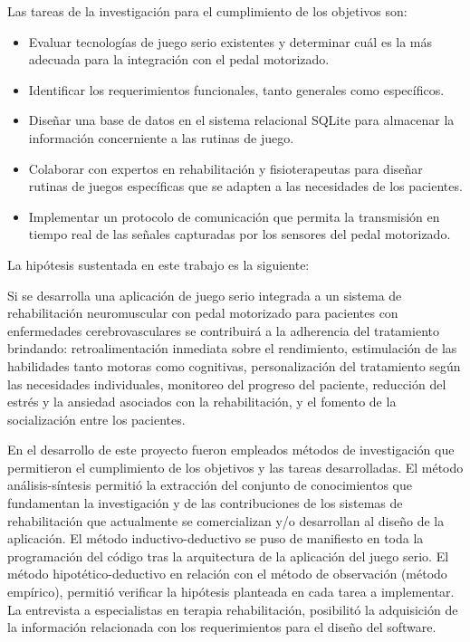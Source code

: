 \begin{introduction}
    Las tareas de la investigación para el cumplimiento de los objetivos son:
    \begin{itemize}
        \item Evaluar tecnologías de juego serio existentes y determinar cuál es la más adecuada para la integración con el pedal motorizado.
        \item Identificar los requerimientos funcionales, tanto generales como específicos.
        \item Diseñar una base de datos en el sistema relacional SQLite para almacenar la información concerniente a las rutinas de juego. 
        \item Colaborar con expertos en rehabilitación y fisioterapeutas para diseñar rutinas de juegos específicas que se adapten a las necesidades de los pacientes.
        \item Implementar un protocolo de comunicación que permita la transmisión en tiempo real de las señales capturadas por los sensores del pedal motorizado. 
    \end{itemize}

    La hipótesis sustentada en este trabajo es la siguiente:

    Si se desarrolla una aplicación de juego serio integrada a un sistema de rehabilitación neuromuscular con pedal motorizado para pacientes con enfermedades cerebrovasculares se contribuirá a la adherencia del tratamiento brindando: retroalimentación inmediata sobre el rendimiento, estimulación de las habilidades tanto motoras como cognitivas, personalización del tratamiento según las necesidades individuales, monitoreo del progreso del paciente, reducción del estrés y la ansiedad asociados con la rehabilitación, y el fomento de la socialización entre los pacientes.

    \vspace{10pt}
    En el desarrollo de este proyecto fueron empleados métodos de investigación que permitieron el cumplimiento de los objetivos y las tareas desarrolladas. El método análisis-síntesis permitió la extracción del conjunto de conocimientos que fundamentan la investigación y de las contribuciones de los sistemas de rehabilitación que actualmente se comercializan y/o desarrollan al diseño de la aplicación. El método inductivo-deductivo se puso de manifiesto en toda la programación del código tras la arquitectura de la aplicación del juego serio. El método hipotético-deductivo en relación con el método de observación (método empírico), permitió verificar la hipótesis planteada en cada tarea a implementar. La entrevista a especialistas en terapia rehabilitación, posibilitó la adquisición de la información relacionada con los requerimientos para el diseño del software.
\end{introduction}